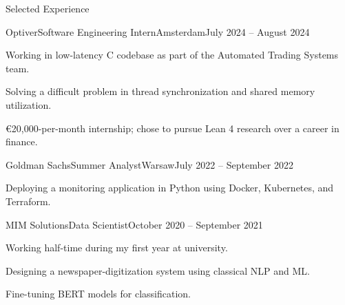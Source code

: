 \documentclass{article}
\newlength{\tabin}
\newlength{\secsep}
\newcommand{\lineunder}{\vspace*{-8pt} \\ \hspace*{-6pt} \hrulefill \\ \vspace*{-15pt}}
\newcommand{\cvlink}[2]{\href{#1}{\nolinkurl{#2}}}
\newenvironment{tabbedsection}[1]{
  \begin{list}{}{
      \setlength{\itemsep}{0pt}
      \setlength{\labelsep}{0pt}
      \setlength{\labelwidth}{0pt}
      \setlength{\leftmargin}{\tabin}
      \setlength{\rightmargin}{\tabin}
      \setlength{\listparindent}{0pt}
      \setlength{\parsep}{0pt}
      \setlength{\parskip}{0pt}
      \setlength{\partopsep}{0pt}
      \setlength{\topsep}{#1}
    }
  \item[]
}{\end{list}}
\newenvironment{resume_section}[1]{
  \filbreak
  \vspace{2\secsep}
  \textsc{\large#1}
  \lineunder
  \begin{tabbedsection}{\secsep}
}{\end{tabbedsection}}
\newenvironment{resume_subsection}[2][]{
  \textbf{#2} \hfill {\footnotesize #1}%
  \begin{tabbedsection}{0.5\secsep}
}{\end{tabbedsection}}
\newenvironment{subitems}{
  \renewcommand{\labelitemi}{-}
  \begin{itemize}
      \setlength{\labelsep}{1em}
}{\end{itemize}}
\newenvironment{resume_employer}[4]{
  \vspace{\secsep}
  \textbf{#1} \\ 
  \def\resumelocation{#3}%
  \indent {\small #2\ifx\resumelocation\empty\else, #3\fi} \hfill {\footnotesize #4}%
  \begin{tabbedsection}{0pt}
  \begin{subitems}
}{\end{subitems}\end{tabbedsection}}
\begin{document}
\begin{resume_section}{Selected Experience}
  \begin{resume_employer}{Optiver}{Software Engineering Intern}{Amsterdam}{July 2024 -- August 2024}
   \item Working in low-latency C codebase as part of the Automated Trading Systems team.
   \item Solving a difficult problem in thread synchronization and shared memory utilization.
   \item €20,000-per-month internship; chose to pursue Lean 4 research over a career in finance.
  \end{resume_employer}
  \begin{resume_employer}{Goldman Sachs}{Summer Analyst}{Warsaw}{July 2022 -- September 2022}
  \item Deploying a monitoring application in Python using Docker, Kubernetes, and Terraform.
  \end{resume_employer}
  \begin{resume_employer}{MIM Solutions}{Data Scientist}{}{October 2020 -- September 2021}
  \item Working half-time during my first year at university.
  \item Designing a newspaper-digitization system using classical NLP and ML.
  \item Fine-tuning BERT models for classification.
  \end{resume_employer}


\end{resume_section}
\end{document}
